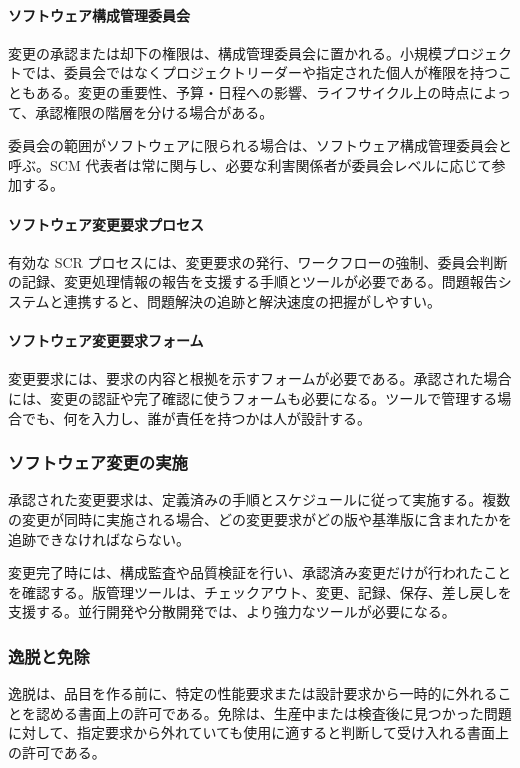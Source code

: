 \documentclass[a4paper,11pt]{ltjsarticle}
\numberwithin{figure}{section}
\numberwithin{table}{section}
\begin{document}
\paragraph*{ソフトウェア構成管理委員会}
変更の承認または却下の権限は、構成管理委員会に置かれる。小規模プロジェクトでは、委員会ではなくプロジェクトリーダーや指定された個人が権限を持つこともある。変更の重要性、予算・日程への影響、ライフサイクル上の時点によって、承認権限の階層を分ける場合がある。

委員会の範囲がソフトウェアに限られる場合は、ソフトウェア構成管理委員会と呼ぶ。SCM 代表者は常に関与し、必要な利害関係者が委員会レベルに応じて参加する。

\paragraph*{ソフトウェア変更要求プロセス}
有効な SCR プロセスには、変更要求の発行、ワークフローの強制、委員会判断の記録、変更処理情報の報告を支援する手順とツールが必要である。問題報告システムと連携すると、問題解決の追跡と解決速度の把握がしやすい。

\paragraph*{ソフトウェア変更要求フォーム}
変更要求には、要求の内容と根拠を示すフォームが必要である。承認された場合には、変更の認証や完了確認に使うフォームも必要になる。ツールで管理する場合でも、何を入力し、誰が責任を持つかは人が設計する。

\subsubsection*{ソフトウェア変更の実施}
承認された変更要求は、定義済みの手順とスケジュールに従って実施する。複数の変更が同時に実施される場合、どの変更要求がどの版や基準版に含まれたかを追跡できなければならない。

変更完了時には、構成監査や品質検証を行い、承認済み変更だけが行われたことを確認する。版管理ツールは、チェックアウト、変更、記録、保存、差し戻しを支援する。並行開発や分散開発では、より強力なツールが必要になる。

\subsubsection*{逸脱と免除}
逸脱は、品目を作る前に、特定の性能要求または設計要求から一時的に外れることを認める書面上の許可である。免除は、生産中または検査後に見つかった問題に対して、指定要求から外れていても使用に適すると判断して受け入れる書面上の許可である。
\end{document}
